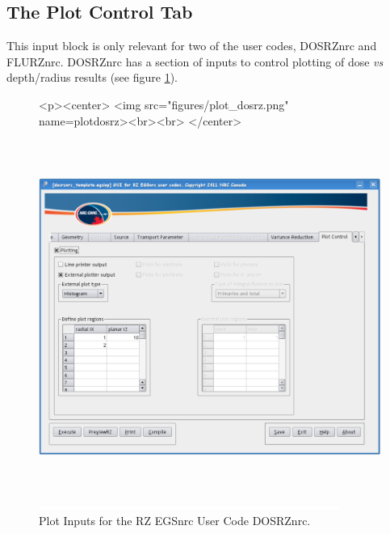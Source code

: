 \documentclass[12pt,twoside]{article}   %
\begin{document}
\newpage
\subsection{The Plot Control Tab}

This input block is only relevant for two of the user codes, DOSRZnrc and FLURZnrc.
DOSRZnrc has a section of inputs to control plotting of dose {\em vs} depth/radius results
(see figure \ref{plotdosrz}).
\begin{figure}[htb]
\begin{htmlonly}
\begin{rawhtml}
<p><center>
<img src="figures/plot_dosrz.png" name=plotdosrz><br><br>
</center>
\end{rawhtml}
\end{htmlonly}
\begin{latexonly}
\begin{center}
\includegraphics[height=11.56cm]{figures/plot_dosrz}
\end{center}
\end{latexonly}
\begin{center}
\includegraphics[height=1mm]{figures/fake2}
\end{center}
\caption{Plot Inputs for the RZ EGSnrc User Code DOSRZnrc.}
\label{plotdosrz}
\end{figure}
\end{document}
